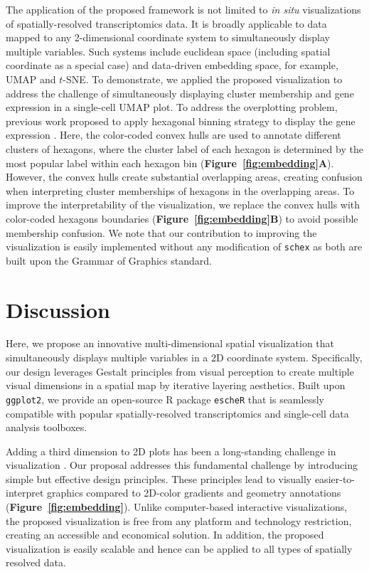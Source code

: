 \documentclass[unnumsec,webpdf,modern,large,namedate]{oup-authoring-template}%
\theoremstyle{thmstyleone}%
\theoremstyle{thmstyletwo}%
\theoremstyle{thmstylethree}%
\newcommand{\rr}[1]{{\color{red} #1}}
\begin{document}
The application of the proposed framework is not limited to \textit{in situ} visualizations of spatially-resolved transcriptomics data. It is broadly applicable to data mapped to any 2-dimensional coordinate system to simultaneously display multiple variables. Such systems include euclidean space (including spatial coordinate as a special case) and data-driven embedding space, for example, UMAP and $t$-SNE. To demonstrate, we applied the proposed visualization to address the challenge of simultaneously displaying cluster membership and gene expression in a single-cell UMAP plot. To address the overplotting problem, previous work proposed to apply hexagonal binning strategy to display the gene expression \citep{freytag_2020}. Here, the color-coded convex hulls are used to annotate different clusters of \rr{hexagons, where the cluster label of each hexagon is determined by the most popular label within each hexagon bin} (\textbf{Figure~\ref{fig:embedding}A}). However, the convex hulls create substantial overlapping areas, creating confusion when interpreting cluster memberships of hexagons in the overlapping areas. To improve the interpretability of the visualization, we replace the convex hulls with color-coded hexagons boundaries (\textbf{Figure~\ref{fig:embedding}B}) to avoid possible membership confusion. We note that our contribution to improving the visualization is easily implemented without any modification of \texttt{schex} as both are built upon the Grammar of Graphics \citep{wilkinson_2012} standard.


\section{Discussion}
Here, we propose an innovative multi-dimensional spatial visualization that simultaneously displays multiple variables in a 2D coordinate system. Specifically, our design leverages Gestalt principles from visual perception to create multiple visual dimensions in a spatial map by iterative layering aesthetics. Built upon \texttt{ggplot2}, we provide an open-source R package \texttt{escheR} that is seamlessly compatible with popular spatially-resolved transcriptomics and single-cell data analysis toolboxes. 

Adding a third dimension to 2D plots has been a long-standing challenge in visualization \citep{odonoghue_2010}. Our proposal addresses this fundamental challenge by introducing simple but effective design principles. These principles lead to visually easier-to-interpret graphics compared to 2D-color gradients and geometry annotations (\textbf{Figure~\ref{fig:embedding}}). Unlike computer-based interactive visualizations, the proposed visualization is free from any platform and technology restriction, creating an accessible and economical solution. In addition, the proposed visualization is easily scalable and hence can be applied to all types of spatially resolved data. 
\end{document}
